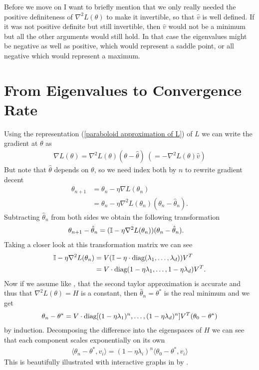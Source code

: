 Before we move on I want to briefly mention that we only really needed the
positive definiteness of \(\nabla^2 L(\theta)\) to make it invertible, so that
\(\hat{v}\) is well defined. If it was not positive definite but still invertible,
then \(\hat{v}\) would not be a minimum but all the other arguments would still
hold.
In that case the eigenvalues might be negative as well as positive, which would
represent a saddle point, or all negative which would represent a maximum.

\section{From Eigenvalues to Convergence Rate}

Using the representation (\ref{paraboloid approximation of L}) of \(L\) we
can write the gradient at \(\theta\) as
%
\begin{align*}
	\nabla L(\theta)
	=  \nabla^2 L(\theta)(\theta-\hat{\theta})
	\ (= -\nabla^2 L(\theta)\hat{v})
\end{align*}
%
But note that \(\hat{\theta}\) depends on \(\theta\), so we need index both
by \(n\) to rewrite gradient decent
%
\begin{align*}
	\theta_{n+1} &= \theta_n - \eta\nabla L(\theta_n)\\
	&= \theta_n - \eta\nabla^2 L(\theta_n)(\theta_n - \hat{\theta}_n).
\end{align*}
%
Subtracting \(\hat{\theta}_n\) from both sides we obtain the following
transformation 
%
\begin{align*}
	\theta_{n+1} - \hat{\theta}_n
	&= (\mathbb{I} - \eta\nabla^2 L(\theta_n) ) (\theta_n - \hat{\theta}_n).
\end{align*}
%
Taking a closer look at this transformation matrix we can see
%
\begin{align*}
	\mathbb{I} - \eta\nabla^2 L(\theta_n)
	&= V(\mathbb{I} - \eta\cdot\text{diag}(\lambda_1,\dots,\lambda_d) )V^T \\
	&= V\cdot\text{diag}(1-\eta\lambda_1, \dots,1-\eta\lambda_d)V^T.
\end{align*}
%
Now if we assume like \textcite{gohWhyMomentumReally2017}, that the second
taylor approximation is accurate and thus that \(\nabla^2 L(\theta)=H\) is a
constant, then \(\hat{\theta}_n = \theta^*\) is the real minimum and we get
%
\begin{align}
	\theta_n - \theta^*
	= V\cdot\text{diag}[(1-\eta\lambda_1)^n,\dots,(1-\eta\lambda_d)^n] V^T (\theta_0 - \theta^*)
\end{align}
%
by induction. Decomposing the difference into the eigenspaces of \(H\) we can 
see that each component scales exponentially on its own 
%
\begin{align*}
	\langle \theta_n -\theta^*, v_i\rangle = (1-\eta\lambda_i)^n \langle \theta_0 - \theta^*, v_i\rangle
\end{align*}
%
This is beautifully illustrated with interactive graphs in
 by \citeauthor{gohWhyMomentumReally2017}.

